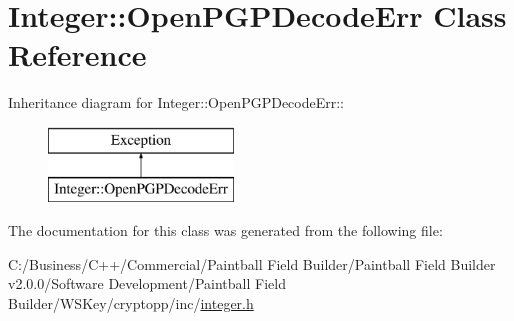 \hypertarget{class_integer_1_1_open_p_g_p_decode_err}{
\section{Integer::OpenPGPDecodeErr Class Reference}
\label{class_integer_1_1_open_p_g_p_decode_err}
}
Inheritance diagram for Integer::OpenPGPDecodeErr::\begin{figure}[H]
\begin{center}
\leavevmode
\includegraphics[height=2cm]{class_integer_1_1_open_p_g_p_decode_err}
\end{center}
\end{figure}


The documentation for this class was generated from the following file:\begin{DoxyCompactItemize}
\item 
C:/Business/C++/Commercial/Paintball Field Builder/Paintball Field Builder v2.0.0/Software Development/Paintball Field Builder/WSKey/cryptopp/inc/\hyperlink{integer_8h}{integer.h}\end{DoxyCompactItemize}
